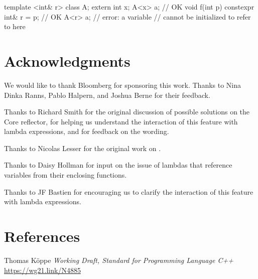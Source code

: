 \documentclass{wg21}
\begin{document}

\begin{addedblock}
\begin{example}
\begin{codeblock}
template <int& r> class A{};
extern int x;
A<x> a;  // OK
void f(int p) {
    constexpr int& r = p;  // OK
    A<r> a;                // error: a  variable
                           // cannot be initialized to refer to  here
}
\end{codeblock}
\end{example}
\end{addedblock}

\section{Acknowledgments}

We would like to thank Bloomberg for sponsoring this work.
Thanks to Nina Dinka Ranns, Pablo Halpern, and Joshua Berne for their feedback.

Thanks to Richard Smith for the original discussion of possible solutions on the Core reflector, for helping us understand the interaction of this feature with lambda expressions, and for feedback on the wording.

Thanks to Nicolas Lesser for the original work on .

Thanks to Daisy Hollman for input on the issue of lambdas that reference
variables from their enclosing functions.

Thanks to JF Bastien for encouraging us to clarify the interaction of this
feature with lambda expressions.

\section{References}

\renewcommand{\section}[2]{}%



\begin{thebibliography}{9}

Thomas Köppe
\emph{Working Draft, Standard for Programming Language C++}\newline
\url{https://wg21.link/N4885}


\end{thebibliography}
\end{document}
